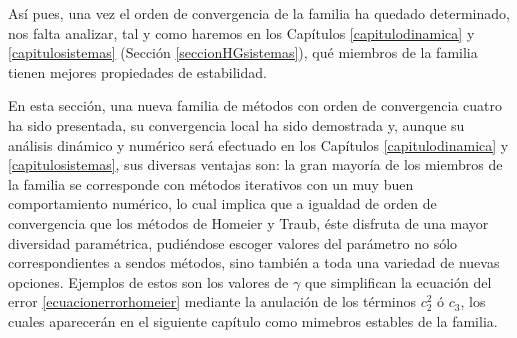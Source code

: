 Así pues, una vez el orden de convergencia de la familia ha quedado determinado, nos falta analizar, tal y como haremos en los Capítulos \ref{capitulodinamica} y \ref{capitulosistemas} (Sección \ref{seccionHGsistemas}), qué miembros de la familia tienen mejores propiedades de estabilidad.

En esta sección, una nueva familia de métodos con orden de convergencia cuatro ha sido presentada, su convergencia local ha sido demostrada y, aunque su análisis dinámico y numérico será efectuado en los Capítulos \ref{capitulodinamica} y \ref{capitulosistemas}, sus diversas ventajas son: la gran mayoría de los miembros de la familia se corresponde con métodos iterativos con un muy buen comportamiento numérico, lo cual implica que a igualdad de orden de convergencia que los métodos de Homeier y Traub, éste disfruta de una mayor diversidad paramétrica, pudiéndose escoger valores del parámetro no sólo correspondientes a sendos métodos, sino también a toda una variedad de nuevas opciones. Ejemplos de estos son los valores de $\gamma$ que simplifican la ecuación del error \eqref{ecuacionerrorhomeier} mediante la anulación de los términos $c_2^2$ ó $c_3$, los cuales aparecerán en el siguiente capítulo como mimebros estables de la familia.
